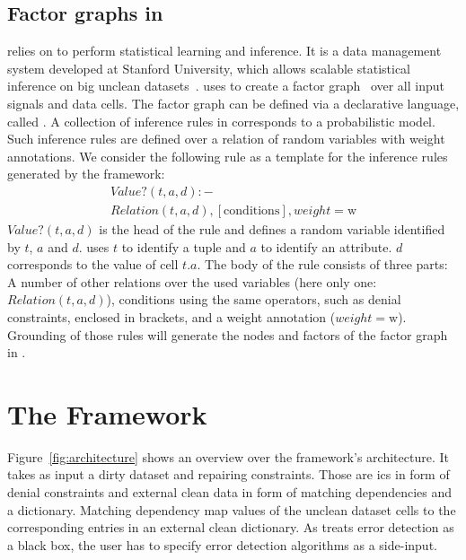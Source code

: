   \subsection{Factor graphs in \deepdive{}}
  \holoclean{} relies on \deepdive{} to perform statistical learning and inference.
  It is a data management system developed at Stanford University, which allows scalable statistical inference on big unclean datasets~\cite{deepdive}.
  \holoclean{} uses \deepdive{} to create a factor graph~\cite{pgmFactorGraph} over all input signals and data cells.
  The factor graph can be defined via a declarative language, called \ddlog{}.
  A collection of inference rules in \deepdive{} corresponds to a probabilistic model.
  Such inference rules are defined over a relation of random variables with weight annotations.
  We consider the following \ddlog{} rule as a template for the inference rules generated by the \holoclean{} framework:
  \begin{multline}
    Value?(t,a,d):-\\Relation(t,a,d), [\text{conditions}], weight=\text{w}
  \end{multline}
  $Value?(t,a,d)$ is the head of the rule and defines a random variable identified by $t$, $a$ and $d$.
  \holoclean{} uses $t$ to identify a tuple and $a$ to identify an attribute.
  $d$ corresponds to the value of cell $t.a$.
  The body of the rule consists of three parts:
  A number of other relations over the used variables (here only one: $Relation(t,a,d)$),
  conditions using the same operators, such as denial constraints, enclosed in brackets, and
  a weight annotation ($weight=\text{w}$).
  Grounding of those rules will generate the nodes and factors of the factor graph in \deepdive{}.
  

\section{The \holoclean{} Framework}\label{sec:framework}
  Figure~\ref{fig:architecture} shows an overview over the framework's architecture.
  It takes as input a dirty dataset and repairing constraints.
  Those are \glspl{ic} in form of denial constraints and external clean data in form of matching dependencies and a dictionary.
  Matching dependency map values of the unclean dataset cells to the corresponding entries in an external clean dictionary.
  As \holoclean{} treats error detection as a black box, the user has to specify error detection algorithms as a side-input.
   
